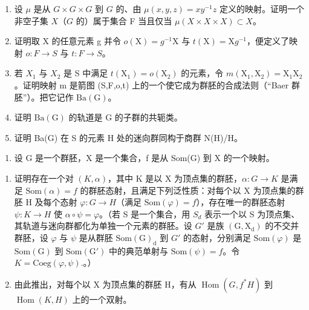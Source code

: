 \begin{enumerate}
\def\labelenumi{\alph{enumi})}
\item
  设 \(\mu\) 是从 \(G \times G \times G\) 到 \(G\) 的、由 \(\mu(x,y,z)=xy^{-1}z\) 定义的映射。证明一个非空子集 \(X\)（\(G\) 的）属于集合 F 当且仅当 \(\mu(X\times X\times X)\subset X\)。
\item
  证明取 X 的任意元素 g 并令 \(o(\mathrm{X}) = g^{-1}\mathrm{X}\) 与 \(t(\mathrm{X}) = \mathrm{X}g^{-1}\)，便定义了映射 \(o: F \to S\) 与 \(t: F \to S\)。
\item
  若 \(X_{1}\) 与 \(X_{2}\) 是 S 中满足 \(t(\mathrm{X}_{1}) = o(\mathrm{X}_{2})\) 的元素，令 \(m(\mathrm{X}_{1}, \mathrm{X}_{2}) = \mathrm{X}_{1}\mathrm{X}_{2}\)。证明映射 m 是箭图 (S,F,o,t) 上的一个使它成为群胚的合成法则（“Baer 群胚”）。把它记作 \(\mathrm{Ba}(\mathrm{G})\)。
\item
  证明 \(\mathrm{Ba}(\mathrm{G})\) 的轨道是 G 的子群的共轭类。
\item
  证明 Ba(G) 在 S 的元素 H 处的迷向群同构于商群 N(H)/H。
\end{enumerate}

\setcounter{exercisegroup}{4}

\exercisegroup

\begin{enumerate}
\def\labelenumi{\arabic{enumi})}
\tightlist
\item
  设 G 是一个群胚，X 是一个集合，f 是从 Som(G) 到 X 的一个映射。
\end{enumerate}

\begin{enumerate}
\def\labelenumi{\alph{enumi})}
\item
  证明存在一个对 \((K,\alpha)\)，其中 K 是以 X 为顶点集的群胚，\(\alpha: G \rightarrow K\) 是满足 \(\mathrm{Som}(\alpha)=f\) 的群胚态射，且满足下列泛性质：对每个以 X 为顶点集的群胚 H 及每个态射 \(\varphi:G\to H\)（满足 \(\mathrm{Som}(\varphi)=f\)），存在唯一的群胚态射 \(\psi:K\to H\) 使 \(\alpha\circ\psi=\varphi\)。（若 S 是一个集合，用 \(S_{d}\) 表示一个以 S 为顶点集、其轨道与迷向群都化为单独一个元素的群胚。设 \(G'\) 是族 \((\mathrm{G},\mathrm{X}_{\mathrm{d}})\) 的不交并群胚，设 \(\varphi\) 与 \(\psi\) 是从群胚 \(\mathrm{Som}(\mathrm{G})_{\mathrm{d}}\) 到 \(G'\) 的态射，分别满足 \(\mathrm{Som}(\varphi)\) 是 \(\mathrm{Som}(\mathrm{G})\) 到 \(\mathrm{Som}(\mathrm{G}')\) 中的典范单射与 \(\mathrm{Som}(\psi)=f\)。令 \(K=\mathrm{Coeg}(\varphi,\psi).\)。）
\item
  由此推出，对每个以 X 为顶点集的群胚 H，有从 \(\operatorname{Hom}(G, f^{*}H)\) 到 \(\operatorname{Hom}(K, H)\) 上的一个双射。
\end{enumerate}

